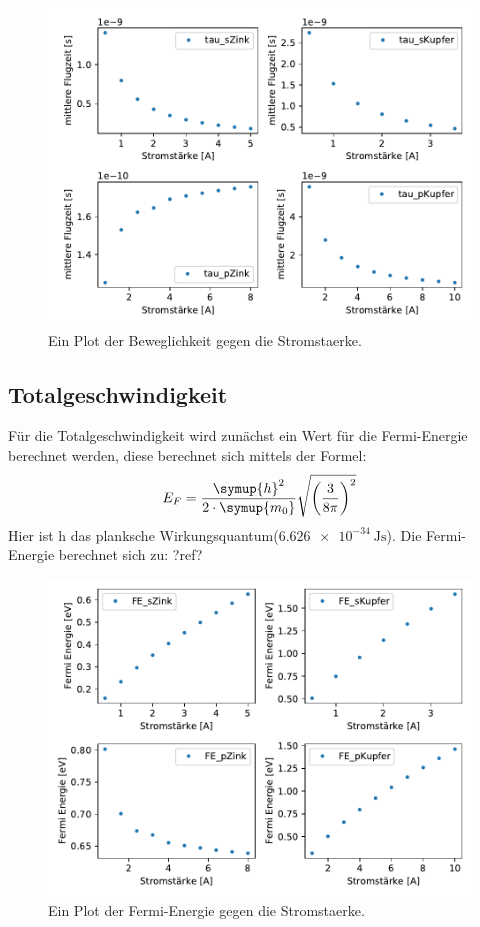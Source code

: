     \begin{figure}[H]
        \centering
        \includegraphics[width=1.1\textwidth]{build/tau.pdf}
        \caption{Ein Plot der Beweglichkeit gegen die Stromstaerke.}
        \label{img:Beweg}
    \end{figure}


    \subsection{Totalgeschwindigkeit}


    Für die Totalgeschwindigkeit wird zunächst ein Wert für die Fermi-Energie berechnet werden, diese berechnet sich mittels der Formel:
    \begin{equation}
        E_F = \frac{\symup{h}^2}{2 \cdot \symup{m_0}}\sqrt{\left(\frac{3}{8\pi}\right)^2}
    \end{equation}
    Hier ist h das planksche Wirkungsquantum($\SI{6.626e-34}{\joule\second}$).
    Die Fermi-Energie berechnet sich zu: ?ref?

    \begin{figure}[H]
        \centering
        \includegraphics[width=1.1\textwidth]{build/Fermi.pdf}
        \caption{Ein Plot der Fermi-Energie gegen die Stromstaerke.}
        \label{img:FE}
    \end{figure}

